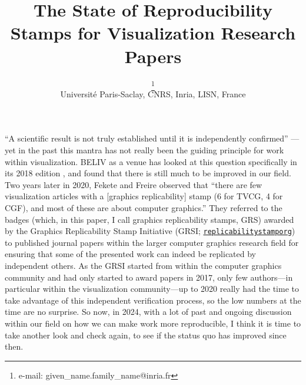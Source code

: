 \documentclass[conference,svgnames]{vgtc}                     %
\title{The State of Reproducibility Stamps for Visualization Research Papers}
\author{%
  \authororcid{Tobias Isenberg}{0000-0001-7953-8644}\thanks{e-mail: given\_name.family\_name@inria.fr}\\ %
        \scriptsize Université Paris-Saclay, CNRS, Inria, LISN, France%
}
\begin{document}


\maketitle

``A scientific result is not truly established until it is independently confirmed'' \cite{Boisvert:2016:IR}---yet in the past this mantra has not really been the guiding principle for work within visualization. BELIV as a venue has looked at this question specifically in its 2018 edition \cite{Haroz:2018:OPV,Kosara:2018:SRC,Sukumar:2018:TDU,Valdez:2018:RRR}, and found that there is still much to be improved in our field. Two years later in 2020, Fekete and Freire \cite{Fekete:2020:ERV} observed that ``there are few visualization articles with a [graphics replicability] stamp (6 for TVCG, 4 for CGF), and most of these are about computer graphics.'' They referred to the badges (which, in this paper, I call graphics replicability\footnotemark{} stamps, GRS) awarded by the Graphics Replicability Stamp Initiative (GRSI; \href{https://www.replicabilitystamp.org/}{\texttt{replicabilitystamporg}}) to published journal\footnotemark{} papers within the larger computer graphics research field for ensuring that some of the presented work can indeed be replicated by independent others. As the GRSI started from within the computer graphics community and had only started to award papers in 2017, only few authors---in particular within the visualization community---up to 2020 really had the time to take advantage of this independent verification process, so the low numbers at the time are no surprise. So now, in 2024, with a lot of past and ongoing discussion within our field on how we can make work more reproducible, I think it is time to take another look and check again, to see if the status quo has improved since then.
\end{document}
